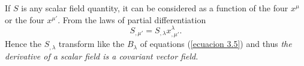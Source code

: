 If $S$ is any scalar field quantity, it can be considered as a function of the 
four $x^\mu$ or the four $x^{\mu'}$. From the laws of partial differentiation 
\[
    S_{,\mu'} = S_{,\lambda} x^{\lambda}_{,\mu'}.
\]
Hence the $S_{,\lambda}$ transform like the $B_{\lambda}$ of equations 
(\ref{ecuacion 3.5}) and thus \emph{the derivative of a scalar field is a 
covariant vector field.}


